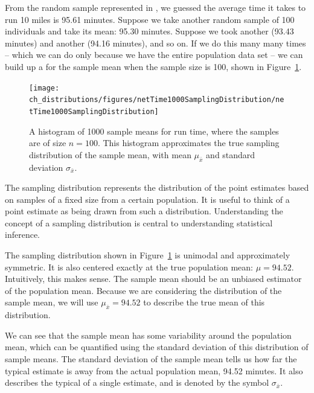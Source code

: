 From the random sample represented in , we guessed the average time it takes to run 10 miles is 95.61 minutes. Suppose we take another random sample of 100 individuals and take its mean: 95.30 minutes. Suppose we took another (93.43 minutes) and another (94.16 minutes), and so on. If we do this many many times -- which we can do only because we have the entire population data set -- we can build up a  for the sample mean when the sample size is 100, shown in Figure~\ref{netTime1000SamplingDistribution}.

\begin{figure}
   \centering
   \texttt{[image: ch\_distributions/figures/netTime1000SamplingDistribution/netTime1000SamplingDistribution]}
   \caption{A histogram of 1000 sample means for run time, where the samples are of size $n=100$. This histogram approximates the true sampling distribution of the sample mean, with mean $\mu_{\bar{x}}$ and standard deviation $\sigma_{\bar{x}}$.}
   \label{netTime1000SamplingDistribution}
\end{figure}

\begin{termBox}{
The sampling distribution represents the distribution of the point estimates based on samples of a fixed size from a certain population. It is useful to think of a point estimate as being drawn from such a distribution. Understanding the concept of a sampling distribution is central to understanding statistical inference.}
\end{termBox}

\textA{\pagebreak}

The sampling distribution shown in Figure~\ref{netTime1000SamplingDistribution} is unimodal and approximately symmetric. It is also centered exactly at the true population mean: $\mu=94.52$. Intuitively, this makes sense. The sample mean should be an unbiased estimator of the population mean. Because we are considering the distribution of the sample mean, we will use $\mu_{\bar{x}} = 94.52$ to describe the true mean of this distribution.

We can see that the sample mean has some variability around the population mean, which can be quantified using the standard deviation of this distribution of sample means. The standard deviation of the sample mean tells us how far the typical estimate is away from the actual population mean, 94.52 minutes. It also describes the typical  of a single estimate, and is denoted by the symbol $\sigma_{\bar{x}}$. 


